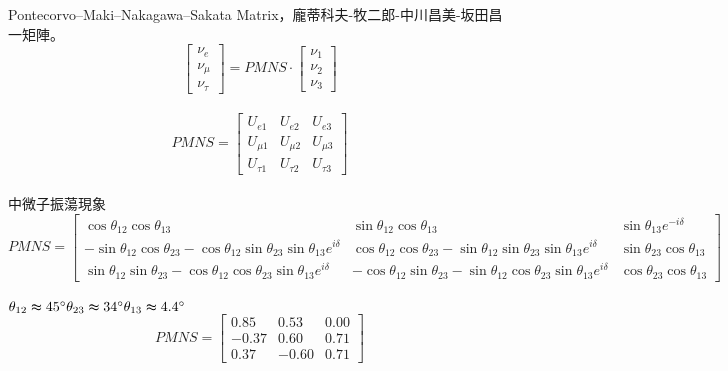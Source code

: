 \documentclass[a4paper,notitlepage,UTF8]{ctexart}
\begin{document}
Pontecorvo–Maki–Nakagawa–Sakata Matrix，龐蒂科夫-牧二郎-中川昌美-坂田昌一矩陣。
\\
\begin{equation}
\left[
\begin{matrix}
\nu_{e}
\\
\nu_{\mu}
\\
\nu_{\tau}
\end{matrix}
\right]
= 
PMNS
\cdot
\left[
\begin{matrix}
\nu_{1}
\\
\nu_{2}
\\
\nu_{3}
\end{matrix}
\right]
\end{equation}
\\
\begin{equation}
PMNS = 
\left[
\begin{matrix}
U_{e 1} & U_{e 2} & U_{e 3} \\
U_{\mu 1} & U_{\mu 2} & U_{\mu 3} \\
U_{\tau 1} & U_{\tau 2} & U_{\tau 3}
\end{matrix}
\right]
\end{equation}
\\
中微子振蕩現象
\\
\begin{equation}
PMNS = 
\left[
\begin{matrix}
\cos{\theta_{12}}\cos{\theta_{13}}
&
\sin{\theta_{12}}\cos{\theta_{13}}
&
\sin{\theta_{13}}e^{-i\delta}
\\
-\sin{\theta_{12}}\cos{\theta_{23}} - 
\cos{\theta_{12}}\sin{\theta_{23}}\sin{\theta_{13}}e^{i\delta}
&
\cos{\theta_{12}}\cos{\theta_{23}} - 
\sin{\theta_{12}}\sin{\theta_{23}}\sin{\theta_{13}}e^{i\delta}
&
\sin{\theta_{23}}\cos{\theta_{13}}
\\
\sin{\theta_{12}}\sin{\theta_{23}} - 
\cos{\theta_{12}}\cos{\theta_{23}}\sin{\theta_{13}}e^{i\delta}
&
-\cos{\theta_{12}}\sin{\theta_{23}} - 
\sin{\theta_{12}}\cos{\theta_{23}}\sin{\theta_{13}}e^{i\delta}
&
\cos{\theta_{23}}\cos{\theta_{13}}
\end{matrix}
\right]
\end{equation}
\\
$
\theta_{12} \thickapprox 45^\circ
\\
\theta_{23} \thickapprox 34^\circ
\\
\theta_{13} \thickapprox 4.4^\circ
$
\\
\begin{equation}
PMNS = 
\left[
\begin{matrix}
0.85 & 0.53 & 0.00 \\
-0.37 & 0.60 & 0.71 \\
0.37 & -0.60 & 0.71
\end{matrix}
\right]
\end{equation}
\end{document}
